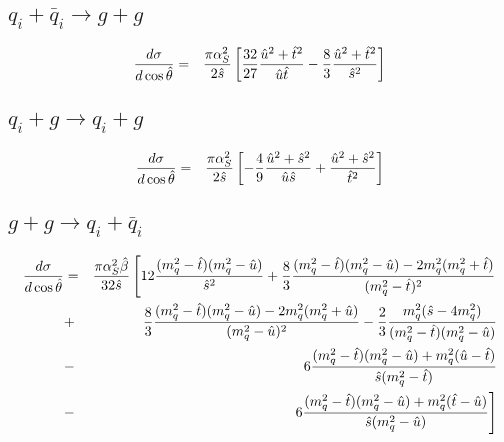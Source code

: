 \subsection{$q_i + \bar{q}_i \rightarrow g + g$}
\begin{eqnarray} 
{d\sigma \over d\cos\hat{\theta}} &=&
{\pi\alpha_S^2 \over 2\hat{s} } 
 \left[ \frac{32}{27}{\hat{u}^2 + \hat{t}^2 \over \hat{u}\hat{t} }
- \frac{8}{3}{\hat{u}^2 + \hat{t}^2 \over \hat{s}^2 } \right]
\end{eqnarray}

\subsection{$q_i + g \rightarrow q_i + g$}
\begin{eqnarray} 
{d\sigma \over d\cos\hat{\theta}} &=&
{\pi\alpha_S^2 \over 2\hat{s} } 
 \left[ -\frac{4}{9}{\hat{u}^2 + \hat{s}^2 \over \hat{u}\hat{s} }
+{\hat{u}^2 + \hat{s}^2 \over \hat{t}^2 } \right]
\end{eqnarray}


\subsection{$g + g \rightarrow q_i + \bar{q}_i$}
\begin{eqnarray} 
{d\sigma \over d\cos\hat{\theta}} &=&
{\pi\alpha_S^2\hat{\beta} \over 32\hat{s} } 
 \left[ 12 {(m_q^2-\hat{t})(m_q^2-\hat{u}) \over \hat{s}^2 }
+ \frac{8}{3} { (m_q^2-\hat{t})(m_q^2-\hat{u}) - 2m_q^2(m_q^2+\hat{t})
   \over (m_q^2 - \hat{t})^2 }
\right. \nonumber \\
&+& \frac{8}{3} { (m_q^2-\hat{t})(m_q^2-\hat{u}) - 2m_q^2(m_q^2+\hat{u})
   \over (m_q^2 - \hat{u})^2 }
- \frac{2}{3}{m_q^2(\hat{s}-4m_q^2) 
  \over (m_q^2-\hat{t})(m_q^2-\hat{u}) }
\nonumber \\ 
&-&  6 { (m_q^2-\hat{t})(m_q^2-\hat{u}) + m_q^2(\hat{u}-\hat{t})
   \over \hat{s}(m_q^2-\hat{t}) }
\nonumber \\
&-& \left. 6 { (m_q^2-\hat{t})(m_q^2-\hat{u}) + m_q^2(\hat{t}-\hat{u})
   \over \hat{s}(m_q^2-\hat{u}) } \right]
\end{eqnarray}


